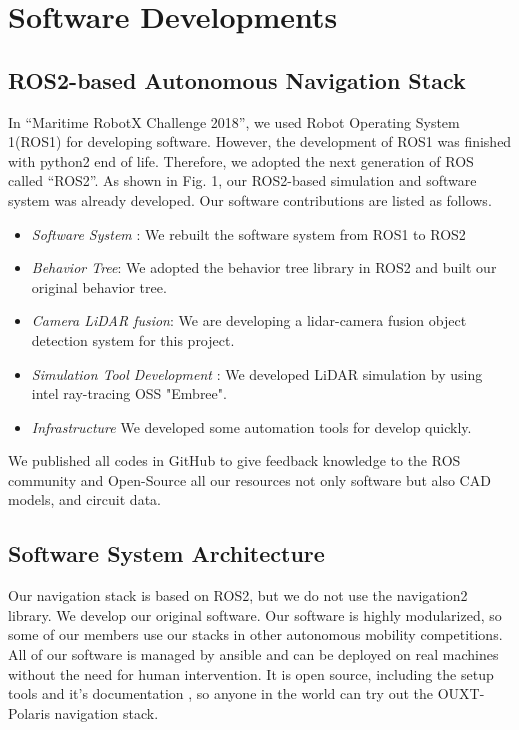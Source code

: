 \documentclass[lettersize,journal]{IEEEtran}
\begin{document}
\section{Software Developments}
\subsection{ROS2-based Autonomous Navigation Stack}
In “Maritime RobotX Challenge 2018”, we used Robot Operating System 1(ROS1) for developing software.
However, the development of ROS1 was finished with python2 end of life.
Therefore, we adopted the next generation of ROS called “ROS2”. \cite{ROS2_paper}
As shown in Fig. 1, our ROS2-based simulation and software system was already developed.
Our software contributions are listed as follows.

\begin{itemize}
  \item {\it Software System }:
    We rebuilt the software system from ROS1 to ROS2
  \item {\it Behavior Tree}:
  We adopted the behavior tree library in ROS2 and built our original behavior tree.  
  \item {\it Camera LiDAR fusion}:
    We are developing a lidar-camera fusion object detection system for this project.
  \item {\it Simulation Tool Development }:
    We developed LiDAR simulation by using intel ray-tracing OSS "Embree".
  \item {\it Infrastructure}
    We developed some automation tools for develop quickly.
\end{itemize}
We published all codes in GitHub to give feedback knowledge to the ROS community and 
Open-Source all our resources not only software \cite{documentation_software}
but also CAD models, and circuit data. \cite{documentation_hardware}

\subsection{Software System Architecture}
Our navigation stack is based on ROS2, but we do not use the navigation2 library. We develop our original software.
Our software is highly modularized, so some of our members use our stacks in other autonomous mobility competitions.
All of our software is managed by ansible and can be deployed on real machines without the need for human intervention.
It is open source, including the setup tools \cite{ouxt_automation} and it's documentation \cite{documentation_software},
so anyone in the world can try out the OUXT-Polaris navigation stack.
\end{document}
